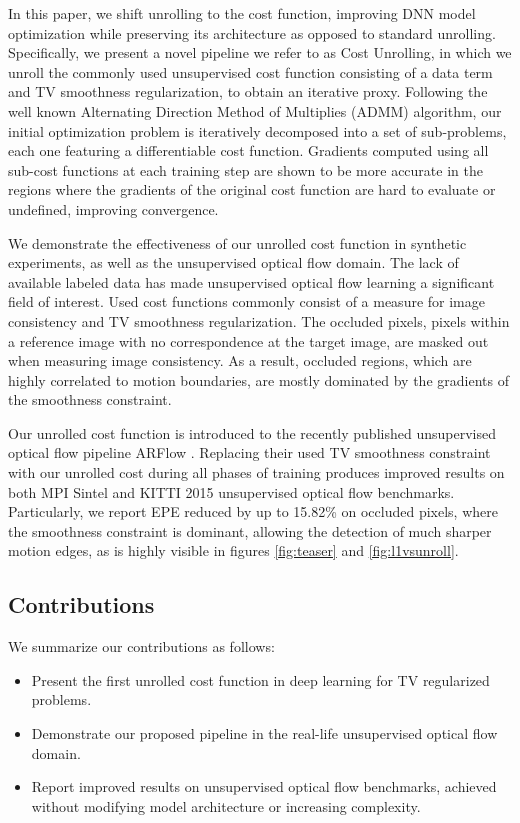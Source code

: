 \documentclass[10pt,twocolumn,letterpaper]{article}
\begin{document}
In this paper, we shift unrolling to the cost function, improving DNN model optimization while preserving its architecture as opposed to standard unrolling. Specifically, we present a novel pipeline we refer to as Cost Unrolling, in which we unroll the commonly used unsupervised cost function consisting of a data term and TV smoothness regularization, to obtain an iterative proxy. Following the well known Alternating Direction Method of Multiplies (ADMM) \cite{admm0} algorithm, our initial optimization problem is iteratively decomposed into a set of sub-problems, each one featuring a differentiable cost function. Gradients computed using all sub-cost functions at each training step are shown to be more accurate in the regions where the gradients of the original cost function are hard to evaluate or undefined, improving convergence. 


We demonstrate the effectiveness of our unrolled cost function in synthetic experiments, as well as the unsupervised optical flow domain. The lack of available labeled data has made unsupervised optical flow learning a significant field of interest. Used cost functions commonly consist of a measure for image consistency and TV smoothness regularization. The occluded pixels, pixels within a reference image with no correspondence at the target image, are masked out when measuring image consistency. As a result, occluded regions, which are highly correlated to motion boundaries, are mostly dominated by the gradients of the smoothness constraint.

Our unrolled cost function is introduced to the recently published unsupervised optical flow pipeline ARFlow \cite{liu2020learning}. Replacing their used TV smoothness constraint with our unrolled cost during all phases of training produces improved results on both MPI Sintel \cite{Butler:ECCV:2012} and KITTI 2015 \cite{Menze2015CVPR} unsupervised optical flow benchmarks.
Particularly, we report EPE reduced by up to 15.82\% on occluded pixels, where the smoothness constraint is dominant, allowing the detection of much sharper motion edges, as is highly visible in figures \ref{fig:teaser} and \ref{fig:l1vsunroll}.



\subsection{Contributions}
We summarize our contributions as follows:
\begin{itemize}
    \item Present the first unrolled cost function in deep learning for TV regularized problems.
    \item Demonstrate our proposed pipeline in the real-life unsupervised optical flow domain.
    \item Report improved results on unsupervised optical flow benchmarks, achieved without modifying model architecture or increasing complexity.
\end{itemize}
\end{document}
